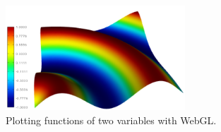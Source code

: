 \begin{figure}[!ht]
\begin{center}
\includegraphics[width=0.6\textwidth]{imgp/webgl.png}
\end{center}
\vspace{-2mm}
\caption{Plotting functions of two variables with WebGL.}
\label{fig:webgl}
\end{figure}

